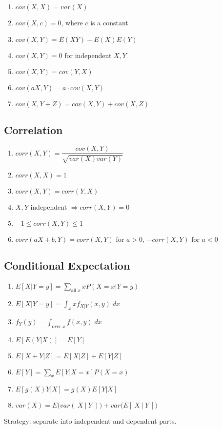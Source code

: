 \documentclass[11pt, twocolumn]{article}
\theoremstyle{definition}
\begin{document}
\begin{enumerate}
\item $cov(X,X)=var(X)$
\item $cov(X,c)=0$, where $c$ is a constant 
\item $cov(X,Y)=E(XY)-E(X)E(Y)$ 
\item $cov(X,Y)=0$ for independent $X,Y$ 
\item $cov(X,Y)=cov(Y,X)$
\item $cov(aX,Y)=a\cdot cov(X,Y)$
\item $cov(X,Y+Z)=cov(X,Y)+cov(X,Z)$
\end{enumerate}


\subsection*{Correlation}
\begin{enumerate}
\item $corr(X,Y)=\dfrac{cov(X,Y)}{\sqrt{var(X)var(Y)}}$
\item $corr(X,X)=1$
\item $corr(X,Y)=corr(Y,X)$
\item $X,Y$ independent $\Rightarrow corr(X,Y)=0$
\item $-1\le corr(X,Y)\le 1$
\item $corr(aX+b,Y)=corr(X,Y)$ for $a>0$, $-corr(X,Y)$ for $a<0$
\end{enumerate}



\subsection*{Conditional Expectation}
\begin{enumerate}
\item $E[X|Y=y]=\sum_{\text{all }x} xP(X=x|Y=y)$
\item  $E[X|Y=y]=\int_{x} x f_{X|Y}(x,y) \; dx$
\item  $f_Y(y)=\int_{\text {over }x} f(x,y) \; dx$
\item $E[ E(Y|X)]=E[Y]$
\item $E[X+Y | Z]=E[X|Z]+E[Y|Z]$ 
\item $E[Y]=\sum_{x} E[Y|X=x]P(X=x)$ 
\item $E[g(X)Y|X]=g(X)E[Y|X]$
\item $var(X)=E\bigg ( var ( \:X\:|\:Y\:) \bigg) + var \bigg ( E[\:X\:|\:Y\:] \bigg )$
\end{enumerate}
Strategy: separate into independent and dependent parts.
\end{document}
